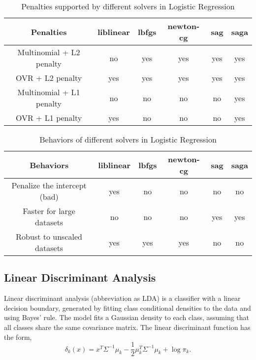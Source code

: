 \documentclass[10pt,journal,compsoc]{IEEEtran}
\begin{document}
\begin{table*}[!htbp]
  \centering
  \caption{Penalties supported by different solvers in Logistic Regression}
  \label{tab:penalties_logreg}
  \begin{tabular*}{\textwidth}{@{\extracolsep{\fill}}cccccc}
    \toprule
    Penalties & liblinear & lbfgs & newton-cg & sag & saga\\
    \midrule
    Multinomial + L2 penalty & no & yes & yes & yes & yes\\
    OVR + L2 penalty & yes & yes & yes & yes & yes\\
    Multinomial + L1 penalty & no & no & no & no & yes\\
    OVR + L1 penalty & yes & no & no & no & yes\\
    \bottomrule
  \end{tabular*}
\end{table*}

\begin{table*}[!htbp]
  \centering
  \caption{Behaviors of different solvers in Logistic Regression}
  \label{tab:behaviors_logreg}
  \begin{tabular*}{\textwidth}{@{\extracolsep{\fill}}cccccc}
    \toprule
    Behaviors & liblinear & lbfgs & newton-cg & sag & saga\\
    \midrule
    Penalize the intercept (bad) & yes & no & no & no & no\\
    Faster for large datasets & no & no & no & yes & yes\\
    Robust to unscaled datasets & yes & yes & yes & no & no\\
    \bottomrule
  \end{tabular*}
\end{table*}

\subsection{Linear Discriminant Analysis}
\label{subsec:linear_discriminant_analysis}
Linear discriminant analysis (abbreviation as LDA) is a classifier with a linear decision boundary, generated by fitting class conditional densities to the data and using Bayes' rule. The model fits a Gaussian density to each class, assuming that all classes share the same covariance matrix. The linear discriminant function has the form, 
\begin{equation}
  \delta_k(x) = x^T\Sigma^{-1}\mu_k - \frac{1}{2}\mu_k^T\Sigma^{-1}\mu_k + \log\pi_k.
\end{equation}
\end{document}
